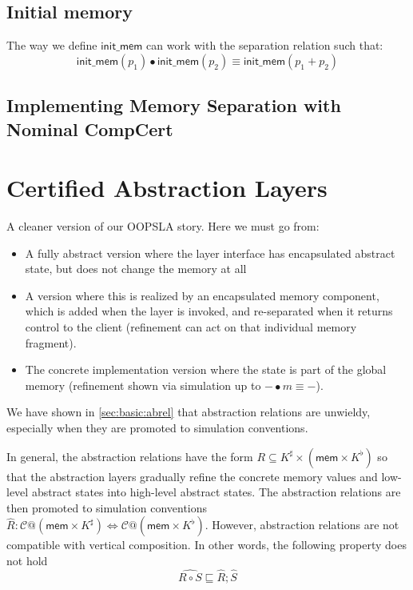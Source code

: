 \documentclass[acmsmall,screen,review,anonymous]{acmart}
\newcommand{\kw}[1]{\ensuremath{ \mathsf{#1} }}
\begin{document}
\subsection{Initial memory} %

The way we define $\kw{init\_mem}$ can work with the
separation relation such that:
\[
  \kw{init\_mem}(p_1) \bullet \kw{init\_mem}(p_2) \equiv
  \kw{init\_mem}(p_1 + p_2)
\]


\subsection{Implementing Memory Separation with Nominal CompCert} %



\section{Certified Abstraction Layers} \label{sec:cal} %

{
\color{gray}
A cleaner version of our OOPSLA story.
Here we must go from:
\begin{itemize}
  \item A fully abstract version where the layer interface
    has encapsulated abstract state,
    but does not change the memory at all
  \item A version where this is realized by an encapsulated
    memory component,
    which is added when the layer is invoked,
    and re-separated when it returns control to the client
    (refinement can act on that individual memory fragment).
  \item The concrete implementation version
    where the state is part of the global memory
    (refinement shown via
    simulation up to ${-} \bullet m \equiv {-}$).
\end{itemize}
}

We have shown in \ref{sec:basic:abrel} that
abstraction relations are unwieldy,
especially when they are promoted to simulation conventions.

In general, the abstraction relations have the form
$R \subseteq K^\sharp \times (\kw{mem} \times K^\flat)$
so that the abstraction layers gradually refine
the concrete memory values and low-level abstract states
into high-level abstract states.
The abstraction relations are then promoted to simulation conventions
$\hat{R}: \mathcal{C}@(\kw{mem}\times K^\sharp)
\Leftrightarrow \mathcal{C}@(\kw{mem}\times K^\flat)$.
However, abstraction relations are not compatible with
vertical composition.
In other words, the following property does not hold
\[
   \hat{R \circ S} \sqsubseteq \hat{R}; \hat{S}
\]
\end{document}
